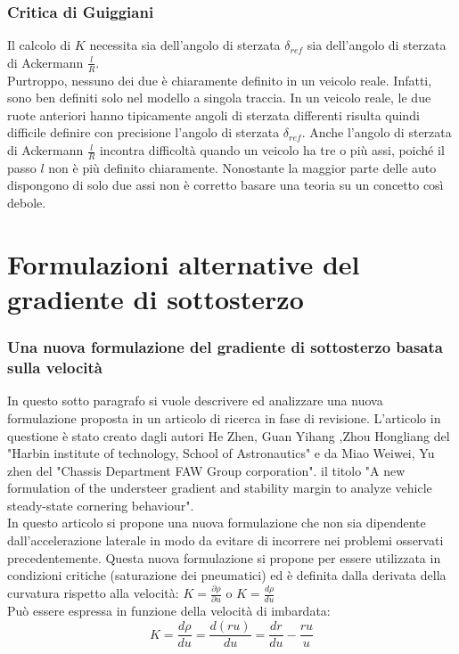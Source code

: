 \subsubsection{Critica di Guiggiani}
Il calcolo di $K$ necessita sia dell'angolo di sterzata $\delta_{ref}$ sia dell'angolo di sterzata di
Ackermann $\frac{l}{R}$.\\ 
Purtroppo, nessuno dei due è chiaramente definito in un veicolo reale. Infatti, sono ben definiti solo nel modello a
singola traccia. In un veicolo reale, le due ruote anteriori hanno tipicamente angoli di sterzata differenti risulta quindi
difficile definire con precisione l'angolo di sterzata $\delta_{ref}$.
Anche l'angolo di sterzata di Ackermann $\frac{l}{R}$ incontra difficoltà quando un veicolo ha tre o più assi, poiché il
passo $l$ non è più definito chiaramente. Nonostante la maggior parte delle auto dispongono di solo due assi non è corretto basare una teoria su un concetto così debole.\\


\section{Formulazioni alternative del gradiente di sottosterzo}
\subsubsection{Una nuova formulazione del gradiente di sottosterzo basata sulla velocità}
In questo sotto paragrafo si vuole descrivere ed analizzare una nuova formulazione proposta in un articolo di ricerca in fase di revisione.
L'articolo in questione è stato creato dagli autori He Zhen, Guan Yihang ,Zhou Hongliang del "Harbin institute of technology, School of Astronautics" e da Miao Weiwei, Yu zhen del "Chassis Department FAW Group corporation".
il titolo "A new formulation of the understeer gradient and stability
margin to analyze vehicle steady-state cornering behaviour".\\

In questo articolo si propone una nuova formulazione che non sia dipendente dall'accelerazione laterale in modo da evitare
di incorrere nei problemi osservati precedentemente.
Questa nuova formulazione si propone per essere utilizzata in condizioni critiche (saturazione dei pneumatici) ed è
definita dalla derivata della curvatura rispetto alla velocità:  $K = \frac{\partial \rho}{\partial u}$ o $K = \frac{d \rho}
{du}$\\ %
Può essere espressa in funzione della velocità di imbardata:
\begin{equation} \label{Kcinesi}
K = \frac{d \rho}{du} = \frac{d(ru)}{du} = \frac{dr}{du} - \frac{ru}{u}
\end{equation}

